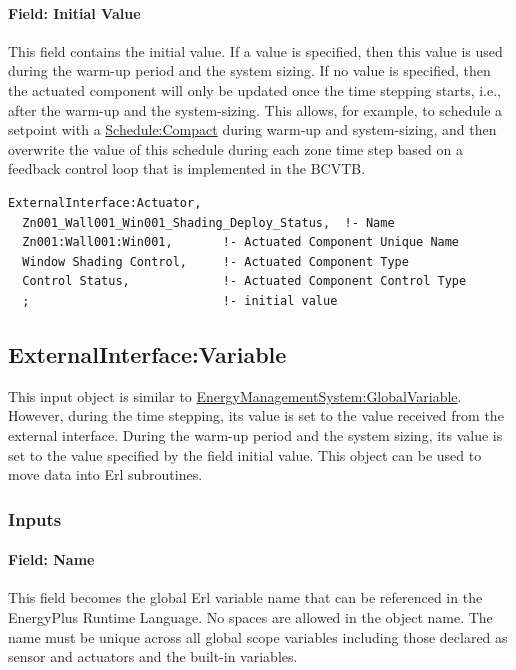 \paragraph{Field: Initial Value}\label{field-initial-value-1}

This field contains the initial value. If a value is specified, then this value is used during the warm-up period and the system sizing. If no value is specified, then the actuated component will only be updated once the time stepping starts, i.e., after the warm-up and the system-sizing. This allows, for example, to schedule a setpoint with a \hyperref[schedulecompact]{Schedule:Compact} during warm-up and system-sizing, and then overwrite the value of this schedule during each zone time step based on a feedback control loop that is implemented in the BCVTB.

\begin{lstlisting}
ExternalInterface:Actuator,
  Zn001_Wall001_Win001_Shading_Deploy_Status,  !- Name
  Zn001:Wall001:Win001,       !- Actuated Component Unique Name
  Window Shading Control,     !- Actuated Component Type
  Control Status,             !- Actuated Component Control Type
  ;                           !- initial value
\end{lstlisting}

\subsection{ExternalInterface:Variable}\label{externalinterfacevariable}

This input object is similar to \hyperref[energymanagementsystemglobalvariable]{EnergyManagementSystem:GlobalVariable}. However, during the time stepping, its value is set to the value received from the external interface. During the warm-up period and the system sizing, its value is set to the value specified by the field initial value. This object can be used to move data into Erl subroutines.

\subsubsection{Inputs}\label{inputs-3-013}

\paragraph{Field: Name}\label{field-name-3-012}

This field becomes the global Erl variable name that can be referenced in the EnergyPlus Runtime Language. No spaces are allowed in the object name. The name must be unique across all global scope variables including those declared as sensor and actuators and the built-in variables.

